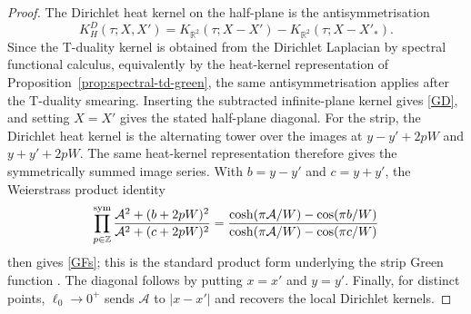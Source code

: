 \documentclass[openacc]{rsproca_new}%
\begin{document}
\begin{proof}
The Dirichlet heat kernel on the half-plane is the antisymmetrisation
\begin{equation}
  K_H^D(\tau;X,X')=K_{\mathbb R^2}(\tau;X-X')-K_{\mathbb R^2}(\tau;X-X'_*).
\end{equation}
Since the T-duality kernel is obtained from the Dirichlet Laplacian by spectral functional calculus, equivalently by the heat-kernel representation of Proposition~\ref{prop:spectral-td-green}, the same antisymmetrisation applies after the T-duality smearing. Inserting the subtracted infinite-plane kernel gives \eqref{GD}, and setting \(X=X'\) gives the stated half-plane diagonal. For the strip, the Dirichlet heat kernel is the alternating tower over the images at \(y-y'+2pW\) and \(y+y'+2pW\). The same heat-kernel representation therefore gives the symmetrically summed image series. With \(b=y-y'\) and \(c=y+y'\), the Weierstrass product identity
\begin{equation}
  \prod_{p\in\mathbb Z}^{\rm sym}
  \frac{\mathcal A^2+(b+2pW)^2}{\mathcal A^2+(c+2pW)^2}
  =\frac{\cosh(\pi\mathcal A/W)-\cos(\pi b/W)}
  {\cosh(\pi\mathcal A/W)-\cos(\pi c/W)}
\end{equation}
then gives \eqref{GFs}; this is the standard product form underlying the strip Green function \cite{DLMF}. The diagonal follows by putting \(x=x'\) and \(y=y'\). Finally, for distinct points, \(\ell_0\to0^+\) sends \(\mathcal A\) to \(|x-x'|\) and recovers the local Dirichlet kernels.
\end{proof}
\end{document}
